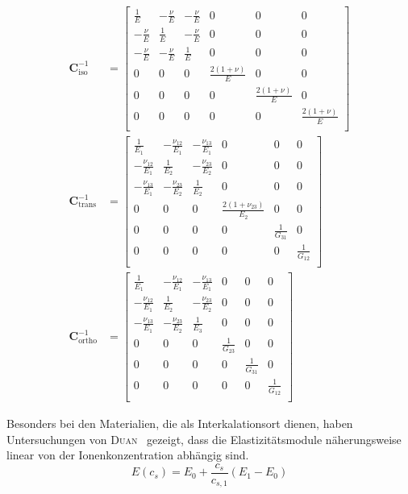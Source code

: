 \begin{align}
\boldsymbol{C}^{-1}_{\text{iso}} &= 
\begin{bmatrix}
    \frac{1}{E} & -\frac{\nu}{E} & -\frac{\nu}{E} & 0 & 0 & 0 \\
    -\frac{\nu}{E}& \frac{1}{E} & -\frac{\nu}{E} & 0 & 0 & 0 \\
    -\frac{\nu}{E} & -\frac{\nu}{E} & \frac{1}{E} & 0 & 0 & 0 \\
    0 & 0 & 0 & \frac{2(1+\nu)}{E} & 0 & 0 \\
    0 & 0 & 0 & 0 & \frac{2(1+\nu)}{E} & 0 \\
    0 & 0 & 0 & 0 & 0 & \frac{2(1+\nu)}{E} \\
\end{bmatrix}\\
\boldsymbol{C}^{-1}_{\text{trans}} &= 
\begin{bmatrix}
    \frac{1}{E_{1}} & -\frac{\nu_{12}}{E_{1}} & -\frac{\nu_{13}}{E_{1}} & 0 & 0 & 0 \\
    -\frac{\nu_{12}}{E_{1}}& \frac{1}{E_{2}} & -\frac{\nu_{23}}{E_{2}} & 0 & 0 & 0 \\
    -\frac{\nu_{13}}{E_{1}} & -\frac{\nu_{23}}{E_{2}} & \frac{1}{E_{2}} & 0 & 0 & 0 \\
    0 & 0 & 0 & \frac{2(1+\nu_{23})}{E_{2}} & 0 & 0 \\
    0 & 0 & 0 & 0 & \frac{1}{G_{31}} & 0 \\
    0 & 0 & 0 & 0 & 0 & \frac{1}{G_{12}} \\
\end{bmatrix}\\
\boldsymbol{C}^{-1}_{\text{ortho}} &= 
\begin{bmatrix}
    \frac{1}{E_{1}} & -\frac{\nu_{12}}{E_{1}} & -\frac{\nu_{13}}{E_{1}} & 0 & 0 & 0 \\
    -\frac{\nu_{12}}{E_{1}}& \frac{1}{E_{2}} & -\frac{\nu_{23}}{E_{2}} & 0 & 0 & 0 \\
    -\frac{\nu_{13}}{E_{1}} & -\frac{\nu_{23}}{E_{2}} & \frac{1}{E_{3}} & 0 & 0 & 0 \\
    0 & 0 & 0 & \frac{1}{G_{23}} & 0 & 0 \\
    0 & 0 & 0 & 0 & \frac{1}{G_{31}} & 0 \\
    0 & 0 & 0 & 0 & 0 & \frac{1}{G_{12}} \\
\end{bmatrix}
\end{align}

Besonders bei den Materialien, die als Interkalationsort dienen, haben Untersuchungen von \textsc{Duan}~\cite{Duan2021} gezeigt, dass die Elastizitätsmodule näherungsweise linear von der Ionenkonzentration abhängig sind.
\begin{equation}
    E(c_{s}) = E_0 + \frac{c_{s}}{c_{s,1}} (E_1 - E_0)
\end{equation}

